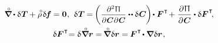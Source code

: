 \nopagebreak\vspace{-0.4em}
\begin{equation}\label{variationsforthecurrentconfiguration}
\begin{array}{c}
\boldnablacircled \hspace{-0.1ex} \dotp \variation{\hspace{.1ex}\firstpiolakirchhoffstress} \hspace{-0.1ex}
+ \mathcircabove{\rho} \hspace{.25ex} \variation{\hspace{-0.2ex}\massloadvector} \hspace{-0.1ex}
= \zerovector
\hspace{.1ex} , \:\,
%
\variation{\hspace{.1ex}\firstpiolakirchhoffstress} \hspace{-0.1ex}
= \hspace{-0.2ex} \left( \hspace{.1ex} \scalebox{.93}{$ \displaystyle\frac{\partial^2 \hspace{.1ex} \potentialenergydensity}{\raisemath{-0.1em}{\partial \hspace{.1ex} \bm{C} \hspace{.1ex} \partial \hspace{.1ex} \bm{C}}} $} \dotdotp \variation{\hspace{.1ex}\bm{C}} \hspace{-0.15ex} \right) \hspace{-0.3ex} \dotp \bm{F}^{\hspace{.1ex}\T} \hspace{-0.3ex}
+ \hspace{.1ex}
\displaystyle\frac{\partial \hspace{.1ex} \potentialenergydensity}{\raisemath{-0.1em}{\partial \hspace{.1ex} \bm{C}}} \dotp \variation{\bm{F}}^{\hspace{.1ex}\T}
\hspace{-0.4ex} ,
\\[1em]
%
\variation{\bm{F}}^{\hspace{.1ex}\T} \hspace{-0.5ex}
= \variation{\hspace{.1ex} \boldnablacircled \currentlocationvector}
= \hspace{-0.2ex} \boldnablacircled \hspace{.1ex} \variation{\currentlocationvector}
= \hspace{-0.1ex} \bm{F}^{\hspace{.1ex}\T} \hspace{-0.25ex} \dotp \boldnabla \hspace{.1ex} \variation{\currentlocationvector} \hspace{.15ex} ,

\end{array}
\end{equation}
